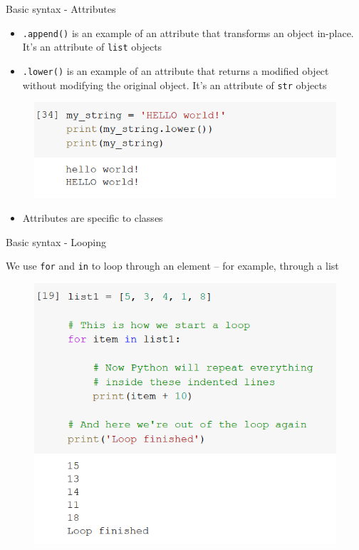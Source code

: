 \documentclass[aspectratio=169]{beamer}
\begin{document}
\begin{frame}{Basic syntax - Attributes}

	\begin{itemize}
		\item \texttt{.append()} is an example of an attribute that transforms an object in-place. It's an attribute of \texttt{list} objects
		\item \texttt{.lower()} is an example of an attribute that returns a modified object without modifying the original object. It's an attribute of \texttt{str} objects
	\end{itemize}

	\begin{figure}
		\centering
		\includegraphics[width=0.6\linewidth]{img/string_lower.png}
	\end{figure}

	\begin{itemize}
		\item Attributes are specific to classes
	\end{itemize}

\end{frame}

\begin{frame}{Basic syntax - Looping}

	We use \texttt{for} and \texttt{in} to loop through an element -- for example, through a list 

	\begin{figure}
		\centering
		\includegraphics[width=0.6\linewidth]{img/list_loop.png}
	\end{figure}

\end{frame}
\end{document}
